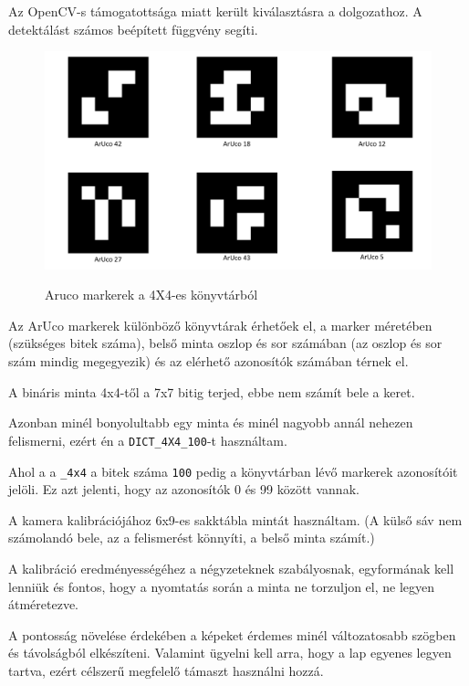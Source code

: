 Az OpenCV-s támogatottsága miatt került kiválasztásra a dolgozathoz. A detektálást számos beépített függvény segíti.\cite{arucom}\\
\begin{figure}[htp]
    \centering
   	\includegraphics[width=4.8truecm, height=3truecm]{images/kep.png}
	\caption{Aruco markerek a 4X4-es könyvtárból}
	\cite{aruco}
\end{figure}


Az ArUco markerek különböző könyvtárak érhetőek el, a marker méretében (szükséges bitek száma), belső minta oszlop és sor számában (az oszlop és sor szám mindig megegyezik) és az elérhető azonosítók számában térnek el.


A bináris minta 4x4-től a 7x7 bitig terjed, ebbe nem számít bele a keret.

Azonban minél bonyolultabb egy minta és minél nagyobb annál nehezen felismerni, ezért én a  \texttt{DICT\_4X4\_100}-t használtam.

Ahol a a \texttt{\_4x4} a bitek száma \texttt{100} pedig a könyvtárban lévő markerek azonosítóit jelöli.
Ez azt jelenti, hogy az azonosítók  0 és 99 között vannak.



A kamera kalibrációjához 6x9-es sakktábla mintát használtam. (A külső sáv nem számolandó bele, az a felismerést könnyíti, a belső minta számít.) 

A kalibráció eredményességéhez a négyzeteknek szabályosnak, egyformának kell lenniük és fontos, hogy a nyomtatás során a minta ne torzuljon el, ne legyen átméretezve. 

A pontosság növelése érdekében a képeket érdemes minél változatosabb szögben és távolságból elkészíteni. Valamint ügyelni kell arra, hogy a lap egyenes legyen tartva, ezért célszerű megfelelő támaszt használni hozzá.

